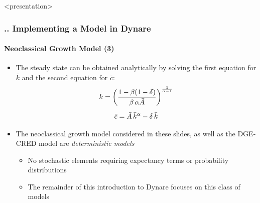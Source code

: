 \documentclass[11pt,aspectratio=169]{beamer}
\begin{document}
\begin{frame}<presentation>
\frametitle{{\thesection.\thesubsection.\thesubsubsection} Implementing a Model in Dynare}
\framesubtitle{Neoclassical Growth Model (3)}
	\begin{itemize}
		\item The steady state can be obtained analytically by solving the first equation for $\bar{k}$ and the second equation for $\bar{c}$:
		\begin{gather*}
		\bar{k} = \bigg(\frac{1-\beta (1-\delta)}{\beta\thinspace\alpha\bar{A}}\bigg)^\frac{1}{\alpha -1}\\[5pt]
		\bar{c} = \bar{A} \thinspace \bar{k}^\alpha - \delta \thinspace \bar{k}		
		\end{gather*}
		\item The neoclassical growth model considered in these slides, as well as the \linebreak DGE-CRED model are \textit{deterministic models}
		\begin{itemize}
			\item No stochastic elements requiring expectancy terms or probability distributions
			\item The remainder of this introduction to Dynare focuses on this class of models
		\end{itemize}  
	\end{itemize}
\end{frame}
\end{document}
